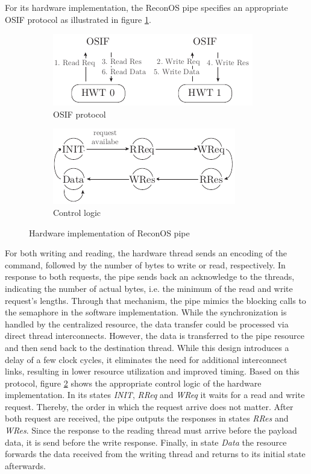 For its hardware implementation, the ReconOS pipe specifies an appropriate
\ac{OSIF} protocol as illustrated in figure \ref{fig:pipe_hw_osif}.
\begin{figure}
	\centering
	\begin{subfigure}{0.49\textwidth}
		\centering
		\includegraphics{../figures/pipe_osif}
		\caption{\acs{OSIF} protocol}
		\label{fig:pipe_hw_osif}
	\end{subfigure}
	\begin{subfigure}{0.49\textwidth}
		\centering
		\includegraphics{../figures/pipe_fsm}
		\caption{Control logic}
		\label{fig:pipe_hw_fsm}
	\end{subfigure}
	\caption{Hardware implementation of ReconOS pipe}
	\label{fig:pipe_hw}
\end{figure}
For both writing and reading, the hardware thread sends an encoding of the
command, followed by the number of bytes to write or read, respectively. In
response to both requests, the pipe sends back an acknowledge to the threads,
indicating the number of actual bytes, i.e. the minimum of the read and write
request's lengths. Through that mechanism, the pipe mimics the blocking calls
to the semaphore in the software implementation. While the synchronization is
handled by the centralized resource, the data transfer could be processed via
direct thread interconnects. However, the data is transferred to the pipe
resource and then send back to the destination thread. While this design
introduces a delay of a few clock cycles, it eliminates the need for
additional interconnect links, resulting in lower resource utilization and
improved timing. Based on this protocol, figure \ref{fig:pipe_hw_fsm} shows
the appropriate control logic of the hardware implementation. In its states
\emph{INIT}, \emph{RReq} and \emph{WReq} it waits for a read and write
request. Thereby, the order in which the request arrive does not matter. After
both request are received, the pipe outputs the responses in states
\emph{RRes} and \emph{WRes}. Since the response to the reading thread must
arrive before the payload data, it is send before the write response. Finally,
in state \emph{Data} the resource forwards the data received from the writing
thread and returns to its initial state afterwards.

